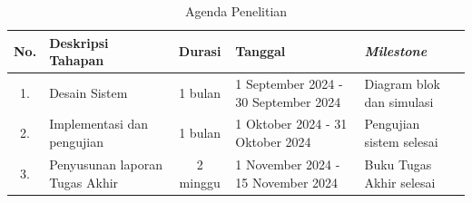 \begin{center}
	\begin{longtable}{|c|m{3.8cm}|c | m{3cm} |m{3cm}|}
		\caption{Agenda Penelitian}
		\label{tab:Agenda}\\
		\hline
		No. & Deskripsi Tahapan & Durasi & Tanggal & \textit{Milestone} \\
		\hline
		1. & Desain Sistem & 1 bulan & 1 September 2024 - 30 September 2024 & Diagram blok dan simulasi \\
		\hline
		2. & Implementasi dan pengujian& 1 bulan & 1 Oktober 2024 - 31 Oktober 2024 & Pengujian sistem selesai \\
		\hline
		3. & Penyusunan laporan Tugas Akhir & 2 minggu & 1 November 2024 - 15 November 2024 & Buku Tugas Akhir selesai \\
		\hline
	\end{longtable}
\end{center}

